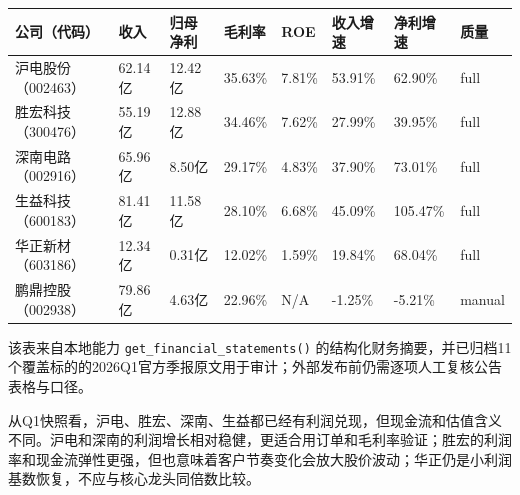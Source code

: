 \begin{exhibitbox}[图表6-3：最新结构化财务快照]
\footnotesize
\begin{tabularx}{\textwidth}{L{1.7cm}R{1.6cm}R{1.6cm}R{1.4cm}R{1.2cm}R{1.5cm}R{1.5cm}X}
\toprule
\textbf{公司（代码）} & \textbf{收入} & \textbf{归母净利} & \textbf{毛利率} & \textbf{ROE} & \textbf{收入增速} & \textbf{净利增速} & \textbf{质量} \\
\midrule
沪电股份（002463） & 62.14亿 & 12.42亿 & 35.63\% & 7.81\% & 53.91\% & 62.90\% & full \\
胜宏科技（300476） & 55.19亿 & 12.88亿 & 34.46\% & 7.62\% & 27.99\% & 39.95\% & full \\
深南电路（002916） & 65.96亿 & 8.50亿 & 29.17\% & 4.83\% & 37.90\% & 73.01\% & full \\
生益科技（600183） & 81.41亿 & 11.58亿 & 28.10\% & 6.68\% & 45.09\% & 105.47\% & full \\
华正新材（603186） & 12.34亿 & 0.31亿 & 12.02\% & 1.59\% & 19.84\% & 68.04\% & full \\
鹏鼎控股（002938） & 79.86亿 & 4.63亿 & 22.96\% & N/A & -1.25\% & -5.21\% & manual \\
\bottomrule
\end{tabularx}
\end{exhibitbox}

\begin{sourcequalitybox}
该表来自本地能力 \texttt{get\_financial\_statements()} 的结构化财务摘要，并已归档11个覆盖标的的2026Q1官方季报原文用于审计；外部发布前仍需逐项人工复核公告表格与口径。
\end{sourcequalitybox}

从Q1快照看，沪电、胜宏、深南、生益都已经有利润兑现，但现金流和估值含义不同。沪电和深南的利润增长相对稳健，更适合用订单和毛利率验证；胜宏的利润率和现金流弹性更强，但也意味着客户节奏变化会放大股价波动；华正仍是小利润基数恢复，不应与核心龙头同倍数比较。

